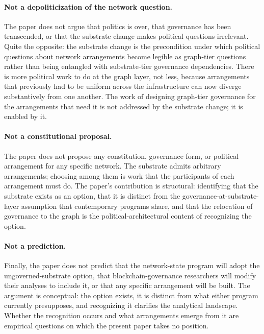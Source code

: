 \documentclass[11pt,a4paper]{article}
\theoremstyle{remark}
\begin{document}
\paragraph{Not a depoliticization of the network question.}
The paper does not argue that politics is over, that governance
has been transcended, or that the substrate change makes
political questions irrelevant. Quite the opposite: the
substrate change is the precondition under which political
questions about network arrangements become legible as
graph-tier questions rather than being entangled with
substrate-tier governance dependencies. There is more
political work to do at the graph layer, not less, because
arrangements that previously had to be uniform across the
infrastructure can now diverge substantively from one another.
The work of designing graph-tier governance for the
arrangements that need it is not addressed by the substrate
change; it is enabled by it.

\paragraph{Not a constitutional proposal.}
The paper does not propose any constitution, governance form,
or political arrangement for any specific network. The
substrate admits arbitrary arrangements; choosing among them is
work that the participants of each arrangement must do. The
paper's contribution is structural: identifying that the
substrate exists as an option, that it is distinct from the
governance-at-substrate-layer assumption that contemporary
programs share, and that the relocation of governance to the
graph is the political-architectural content of recognizing the
option.

\paragraph{Not a prediction.}
Finally, the paper does not predict that the network-state
program will adopt the ungoverned-substrate option, that
blockchain-governance researchers will modify their analyses to
include it, or that any specific arrangement will be built. The
argument is conceptual: the option exists, it is distinct from
what either program currently presupposes, and recognizing it
clarifies the analytical landscape. Whether the recognition
occurs and what arrangements emerge from it are empirical
questions on which the present paper takes no position.

\end{document}
